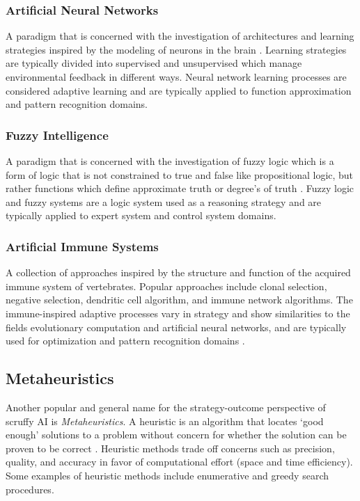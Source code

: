 \subsubsection{Artificial Neural Networks}
A paradigm that is concerned with the investigation of architectures and learning strategies inspired by the modeling of neurons in the brain \cite{Bishop1995}. Learning strategies are typically divided into supervised and unsupervised which manage environmental feedback in different ways. Neural network learning processes are considered adaptive learning and are typically applied to function approximation and pattern recognition domains.

\subsubsection{Fuzzy Intelligence}
A paradigm that is concerned with the investigation of fuzzy logic which is a form of logic that is not constrained to true and false like propositional logic, but rather functions which define approximate truth or degree’s of truth \cite{Zadeh1996}. Fuzzy logic and fuzzy systems are a logic system used as a reasoning strategy and are typically applied to expert system and control system domains.

\subsubsection{Artificial Immune Systems}
A collection of approaches inspired by the structure and function of the acquired immune system of vertebrates. Popular approaches include clonal selection, negative selection, dendritic cell algorithm, and immune network algorithms. The immune-inspired adaptive processes vary in strategy and show similarities to the fields evolutionary computation and artificial neural networks, and are typically used for optimization and pattern recognition domains \cite{Castro2002}.  

% 
% 
\subsection{Metaheuristics}
\label{sec:metaheuristics}
Another popular and general name for the strategy-outcome perspective of scruffy AI is \emph{Metaheuristics}. 
A heuristic is an algorithm that locates `good enough' solutions to a problem without concern for whether the solution can be proven to be correct \cite{Michalewicz2004}. Heuristic methods trade off concerns such as precision, quality, and accuracy in favor of computational effort (space and time efficiency). Some examples of heuristic methods include enumerative and greedy search procedures.

